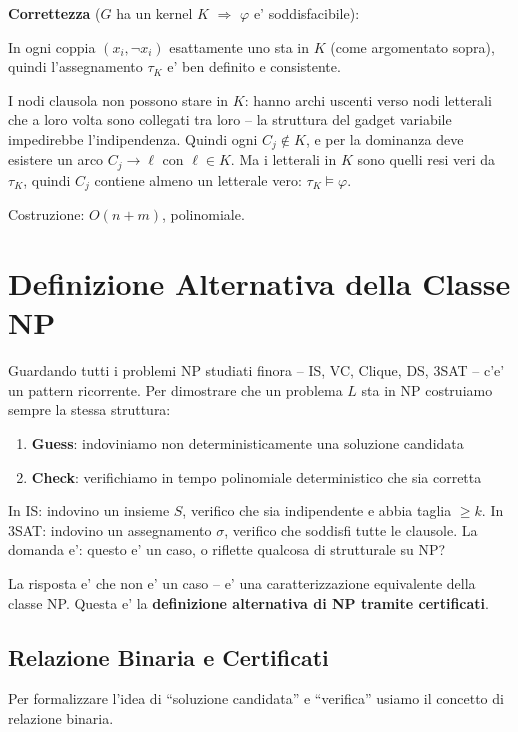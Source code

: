 {  \textbf{Correttezza} ($G$ ha un kernel $K$ $\Rightarrow$ $\varphi$ e' soddisfacibile):

  In ogni coppia $(x_i, \neg x_i)$ esattamente uno sta in $K$ (come argomentato sopra), quindi l'assegnamento $\tau_K$ e' ben definito e consistente.

  I nodi clausola non possono stare in $K$: hanno archi uscenti verso nodi letterali che a loro volta sono collegati tra loro -- la struttura del gadget variabile impedirebbe l'indipendenza. Quindi ogni $C_j \notin K$, e per la dominanza deve esistere un arco $C_j \to \ell$ con $\ell \in K$. Ma i letterali in $K$ sono quelli resi veri da $\tau_K$, quindi $C_j$ contiene almeno un letterale vero: $\tau_K \models \varphi$.

  Costruzione: $O(n + m)$, polinomiale.
}

\section{Definizione Alternativa della Classe NP}

Guardando tutti i problemi NP studiati finora -- IS, VC, Clique, DS, 3SAT -- c'e' un pattern ricorrente. Per dimostrare che un problema $L$ sta in NP costruiamo sempre la stessa struttura:
\begin{enumerate}
  \item \textbf{Guess}: indoviniamo non deterministicamente una soluzione candidata
  \item \textbf{Check}: verifichiamo in tempo polinomiale deterministico che sia corretta
\end{enumerate}
In IS: indovino un insieme $S$, verifico che sia indipendente e abbia taglia $\geq k$. In 3SAT: indovino un assegnamento $\sigma$, verifico che soddisfi tutte le clausole. La domanda e': questo e' un caso, o riflette qualcosa di strutturale su NP?

La risposta e' che non e' un caso -- e' una caratterizzazione equivalente della classe NP. Questa e' la \textbf{definizione alternativa di NP tramite certificati}.

\subsection{Relazione Binaria e Certificati}

Per formalizzare l'idea di ``soluzione candidata'' e ``verifica'' usiamo il concetto di relazione binaria.


